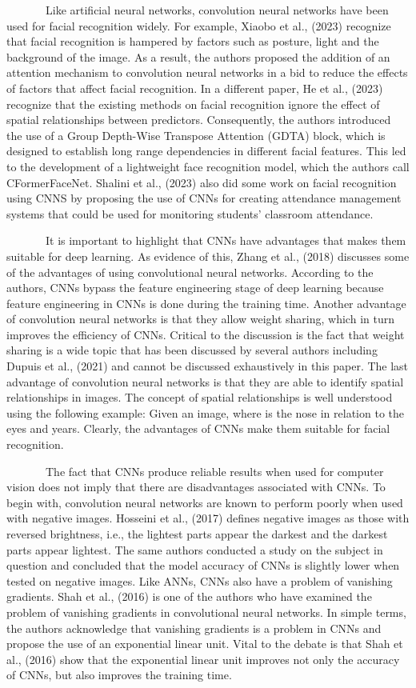 \documentclass[
  12pt,
]{report}
\begin{document}
~~~~~~~Like artificial neural networks, convolution neural networks have
been used for facial recognition widely. For example, Xiaobo et al.,
(2023) recognize that facial recognition is hampered by factors such as
posture, light and the background of the image. As a result, the authors
proposed the addition of an attention mechanism to convolution neural
networks in a bid to reduce the effects of factors that affect facial
recognition. In a different paper, He et al., (2023) recognize that the
existing methods on facial recognition ignore the effect of spatial
relationships between predictors. Consequently, the authors introduced
the use of a Group Depth-Wise Transpose Attention (GDTA) block, which is
designed to establish long range dependencies in different facial
features. This led to the development of a lightweight face recognition
model, which the authors call CFormerFaceNet. Shalini et al., (2023)
also did some work on facial recognition using CNNS by proposing the use
of CNNs for creating attendance management systems that could be used
for monitoring students' classroom attendance.

~~~~~~~It is important to highlight that CNNs have advantages that makes
them suitable for deep learning. As evidence of this, Zhang et al.,
(2018) discusses some of the advantages of using convolutional neural
networks. According to the authors, CNNs bypass the feature engineering
stage of deep learning because feature engineering in CNNs is done
during the training time. Another advantage of convolution neural
networks is that they allow weight sharing, which in turn improves the
efficiency of CNNs. Critical to the discussion is the fact that weight
sharing is a wide topic that has been discussed by several authors
including Dupuis et al., (2021) and cannot be discussed exhaustively in
this paper. The last advantage of convolution neural networks is that
they are able to identify spatial relationships in images. The concept
of spatial relationships is well understood using the following example:
Given an image, where is the nose in relation to the eyes and years.
Clearly, the advantages of CNNs make them suitable for facial
recognition.

~~~~~~~The fact that CNNs produce reliable results when used for
computer vision does not imply that there are disadvantages associated
with CNNs. To begin with, convolution neural networks are known to
perform poorly when used with negative images. Hosseini et al., (2017)
defines negative images as those with reversed brightness, i.e., the
lightest parts appear the darkest and the darkest parts appear lightest.
The same authors conducted a study on the subject in question and
concluded that the model accuracy of CNNs is slightly lower when tested
on negative images. Like ANNs, CNNs also have a problem of vanishing
gradients. Shah et al., (2016) is one of the authors who have examined
the problem of vanishing gradients in convolutional neural networks. In
simple terms, the authors acknowledge that vanishing gradients is a
problem in CNNs and propose the use of an exponential linear unit. Vital
to the debate is that Shah et al., (2016) show that the exponential
linear unit improves not only the accuracy of CNNs, but also improves
the training time.
\end{document}
